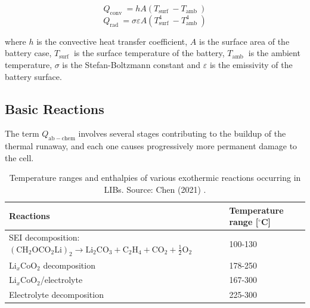 \begin{equation}
    \label{eq:convection-heat}
    Q_{\text {conv }}=h A\left(T_{\text {surf }}-T_{\text {amb }}\right)
\end{equation}
\begin{equation}
    \label{eq:radiation-heat}
    Q_{\text {rad }}=\sigma \varepsilon A\left(T_{\text {surf }}^{4}-T_{\text {amb }}^{4}\right)
\end{equation}

where $h$ is the convective heat transfer coefficient, $A$ is the surface area of the battery case, $T_{\text {surf }}$ is the surface temperature of the battery, $T_{\text {amb }}$ is the ambient temperature, $\sigma$ is the Stefan-Boltzmann constant and $\varepsilon$ is the emissivity of the battery surface.

\subsection{Basic Reactions}
\label{sec:basic-reactions}
The term $Q_{\mathrm{ab}-\text{chem}}$ involves several stages contributing to the buildup of the thermal runaway, and each one causes progressively more permanent damage to the cell. %

\begin{table}[ht]
    \centering
    \begin{footnotesize}
        \begin{tabular}{|P{120mm} P{25mm}|}
            \hline
            \vspace{0.1mm}\textbf{Reactions} & \textbf{Temperature range [$^\circ$C]}\T\B \\
            \hline \hline

            SEI decomposition: $\left(\mathrm{CH}_2 \mathrm{OCO}_2 \mathrm{Li}\right)_2 \rightarrow \mathrm{Li}_2 \mathrm{CO}_3+\mathrm{C}_2 \mathrm{H}_4+\mathrm{CO}_2+\frac{1}{2} \mathrm{O}_2$& 100-130\T\B\\

            Li$_x$CoO$_2$ decomposition & 178-250\T\B\\

            Li$_x$CoO$_2$/electrolyte & 167-300\T\B\\

            Electrolyte decomposition & 225-300 \T\B\\
            \hline
        \end{tabular}
        \\[10pt]
        \caption[Exothermic reactions occurring in LIBs]{Temperature ranges and enthalpies of various exothermic reactions occurring in LIBs. Source: Chen (2021) \cite{chen2021review}.}
        \label{table:reactions}
    \end{footnotesize}
\end{table}

